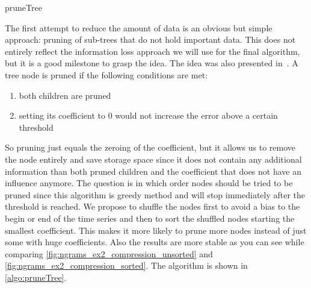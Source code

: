 \begin{algorithm}



    \caption{pruneTree}\label{algo:pruneTree}
\end{algorithm}

The first attempt to reduce the amount of data is an obvious but simple approach: pruning of sub-trees that do not hold important data. This does not entirely reflect the information loss approach we will use for the final algorithm, but it is a good milestone to grasp the idea. The idea was also presented in~\cite{RACE}. A tree node is pruned if the following conditions are met:

\begin{enumerate}
    \item both children are pruned
    \item setting its coefficient to $0$ would not increase the error above a certain threshold
\end{enumerate}

So pruning just equals the zeroing of the coefficient, but it allows us to remove the node entirely and save storage space since it does not contain any additional information than both pruned children and the coefficient that does not have an influence anymore. The question is in which order nodes should be tried to be pruned since this algorithm is greedy method and will stop immediately after the threshold is reached. We propose to shuffle the nodes first to avoid a bias to the begin or end of the time series and then to sort the shuffled nodes starting the smallest coefficient. This makes it more likely to prune more nodes instead of just some with huge coefficients. Also the results are more stable as you can see while comparing \autoref{fig:ngrams_ex2_compression_unsorted} and \autoref{fig:ngrams_ex2_compression_sorted}. The algorithm is shown in \autoref{algo:pruneTree}.

